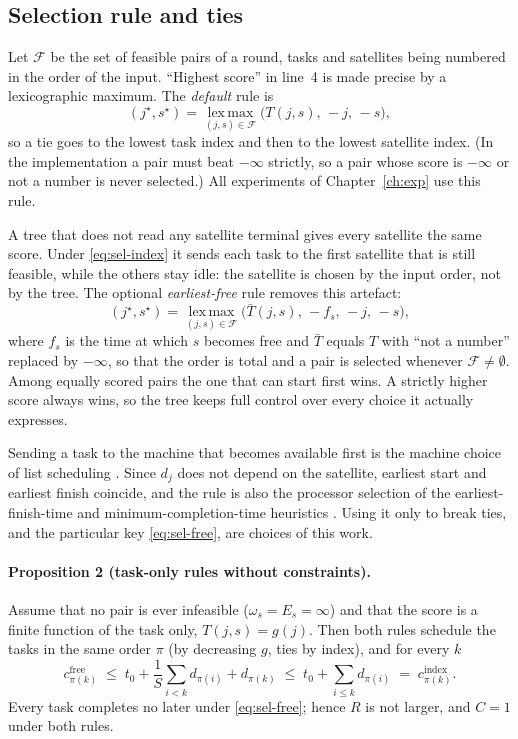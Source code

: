 \subsection{Selection rule and ties}
\label{sec:ties}
Let $\mathcal{F}$ be the set of feasible pairs of a round, tasks and satellites
being numbered in the order of the input. ``Highest score'' in line~4 is made
precise by a lexicographic maximum. The \emph{default} rule is
\begin{equation}
  (j^\star,s^\star)=\operatorname*{lex\,max}_{(j,s)\in\mathcal{F}}
  \bigl(T(j,s),\,-j,\,-s\bigr),
  \label{eq:sel-index}
\end{equation}
so a tie goes to the lowest task index and then to the lowest satellite index.
(In the implementation a pair must beat $-\infty$ strictly, so a pair whose
score is $-\infty$ or not a number is never selected.) All experiments of
Chapter~\ref{ch:exp} use this rule.

A tree that does not read any satellite terminal gives every satellite the same
score. Under \eqref{eq:sel-index} it sends each task to the first satellite that
is still feasible, while the others stay idle: the satellite is chosen by the
input order, not by the tree. The optional \emph{earliest-free} rule removes this
artefact:
\begin{equation}
  (j^\star,s^\star)=\operatorname*{lex\,max}_{(j,s)\in\mathcal{F}}
  \bigl(\bar T(j,s),\,-f_s,\,-j,\,-s\bigr),
  \label{eq:sel-free}
\end{equation}
where $f_s$ is the time at which $s$ becomes free and $\bar T$ equals $T$ with
``not a number'' replaced by $-\infty$, so that the order is total and a pair is
selected whenever $\mathcal{F}\neq\emptyset$. Among equally scored pairs the one
that can start first wins. A strictly higher score always wins, so the tree
keeps full control over every choice it actually expresses.

Sending a task to the machine that becomes available first is the machine
choice of list scheduling \citep{graham1966bounds}. Since $d_j$ does not depend
on the satellite, earliest start and earliest finish coincide, and the rule is
also the processor selection of the earliest-finish-time and
minimum-completion-time heuristics
\citep{topcuoglu2002heft,braun2001comparison}. Using it only to break ties, and
the particular key \eqref{eq:sel-free}, are choices of this work.

\paragraph{Proposition 2 (task-only rules without constraints).} Assume that no
pair is ever infeasible ($\omega_s=E_s=\infty$) and that the score is a finite
function of the task only, $T(j,s)=g(j)$. Then both rules schedule the tasks in
the same order $\pi$ (by decreasing $g$, ties by index), and for every $k$
\begin{equation}
  c^{\mathrm{free}}_{\pi(k)}\;\le\;t_0+\frac1S\sum_{i<k}d_{\pi(i)}+d_{\pi(k)}
  \;\le\;t_0+\sum_{i\le k}d_{\pi(i)}\;=\;c^{\mathrm{index}}_{\pi(k)} .
\end{equation}
Every task completes no later under \eqref{eq:sel-free}; hence $R$ is not larger,
and $C=1$ under both rules.

